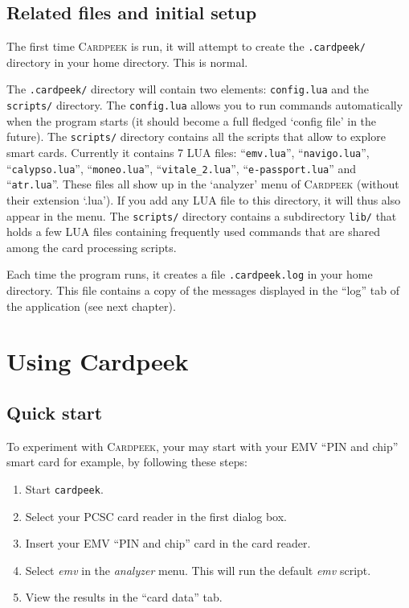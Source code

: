 \documentclass[11pt]{report}
\newcommand{\Cardpeek}{\textsc{Cardpeek}}
\begin{document}
\section{Related files and initial setup}
The first time \Cardpeek{} is run, it will attempt to create the
\texttt{.cardpeek/} directory in your home directory. This is normal.

The \texttt{.cardpeek/} directory will contain two elements: \texttt{config.lua} and the \texttt{scripts/} directory.
The \texttt{config.lua} allows you to run commands automatically when the program starts 
(it should become a full fledged `config file' in the future).
The \texttt{scripts/} directory contains all the scripts that allow to explore smart cards. 
Currently it contains 7 LUA files: ``\texttt{emv.lua}'', ``\texttt{navigo.lua}'', ``\texttt{calypso.lua}'', 
``\texttt{moneo.lua}'', ``\texttt{vitale\_2.lua}'', ``\texttt{e-passport.lua}'' and ``\texttt{atr.lua}''.
These files all show up in the `analyzer' menu of \Cardpeek{} (without their extension `.lua').
If you add any LUA file to this directory, it will thus also appear in the menu.
The \texttt{scripts/} directory contains a subdirectory \texttt{lib/} that holds a few LUA files containing 
frequently used commands that are shared among the card processing scripts.

Each time the program runs, it creates a file \texttt{.cardpeek.log} in your home directory.
This file contains a copy of the messages displayed in the ``log'' tab of the application (see next chapter). 

\chapter{Using Cardpeek}

\section{Quick start}

To experiment with \Cardpeek, your may start with your EMV ``PIN and chip'' smart card for example, 
by following these steps:
\begin{enumerate}
\item{Start \texttt{cardpeek}.}
\item{Select your PCSC card reader in the first dialog box.}
\item{Insert your EMV ``PIN and chip'' card in the card reader.}
\item{Select \emph{emv} in the \emph{analyzer} menu. This will run the default \emph{emv} script.}
\item{View the results in the ``card data'' tab.}
\end{enumerate}
\end{document}

